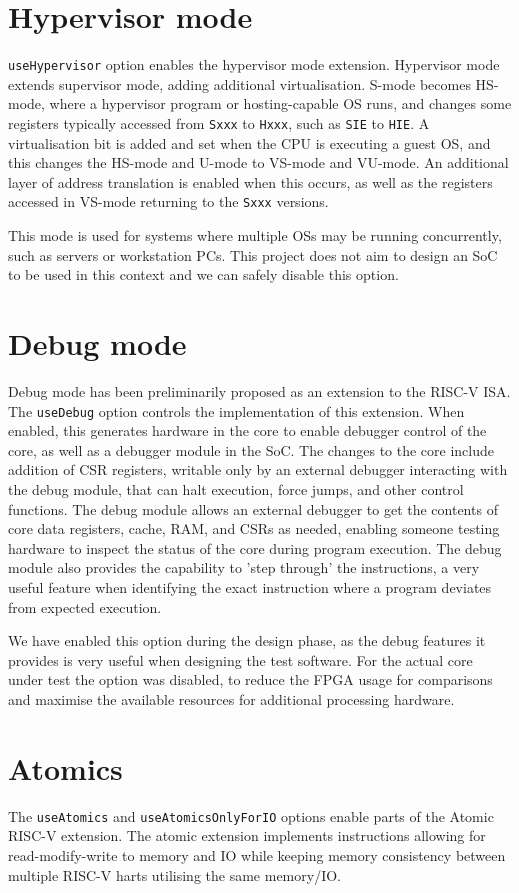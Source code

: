 \section{Hypervisor mode}
\texttt{useHypervisor} option enables the hypervisor mode extension. Hypervisor mode extends supervisor mode, adding additional virtualisation. S-mode becomes HS-mode, where a hypervisor program or hosting-capable OS runs, and changes some registers typically accessed from \texttt{Sxxx} to \texttt{Hxxx}, such as \texttt{SIE} to \texttt{HIE}. A virtualisation bit is added and set when the CPU is executing a guest OS, and this changes the HS-mode and U-mode to VS-mode and VU-mode. An additional layer of address translation is enabled when this occurs, as well as the registers accessed in VS-mode returning to the \texttt{Sxxx} versions.

This mode is used for systems where multiple OSs may be running concurrently, such as servers or workstation PCs. This project does not aim to design an SoC to be used in this context and we can safely disable this option.

\section{Debug mode}
Debug mode has been preliminarily proposed as an extension to the RISC-V ISA. The \texttt{useDebug} option controls the implementation of this extension. When enabled, this generates hardware in the core to enable debugger control of the core, as well as a debugger module in the SoC. The changes to the core include addition of CSR registers, writable only by an external debugger interacting with the debug module, that can halt execution, force jumps, and other control functions. The debug module allows an external debugger to get the contents of core data registers, cache, RAM, and CSRs as needed, enabling someone testing hardware to inspect the status of the core during program execution. The debug module also provides the capability to 'step through' the instructions, a very useful feature when identifying the exact instruction where a program deviates from expected execution.

We have enabled this option during the design phase, as the debug features it provides is very useful when designing the test software. For the actual core under test the option was disabled, to reduce the FPGA usage for comparisons and maximise the available resources for additional processing hardware.

\section{Atomics}
The \texttt{useAtomics} and \texttt{useAtomicsOnlyForIO} options enable parts of the Atomic RISC-V extension. The atomic extension implements instructions allowing for read-modify-write to memory and IO while keeping memory consistency between multiple RISC-V harts utilising the same memory/IO.


